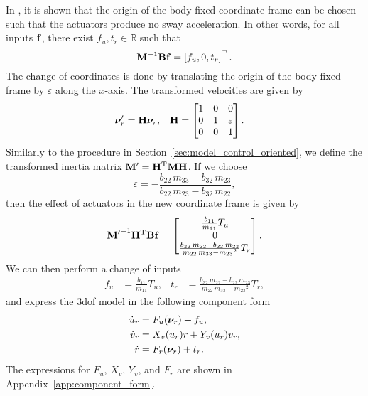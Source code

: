 In \cite{fredriksen_global_2006}, it is shown that the origin of the body-fixed coordinate frame can be chosen such that the actuators produce no sway acceleration.
In other words, for all inputs $\mathbf{f}$, there exist $f_u, t_r \in \mathbb{R}$ such that
\begin{equation}
    \mathbf{M}^{-1}\mathbf{B}\mathbf{f} = \left[f_u, 0, t_r\right]^{\mathrm{T}}.
\end{equation}
The change of coordinates is done by translating the origin of the body-fixed frame by $\varepsilon$ along the $x$-axis.
The transformed velocities are given by
\begin{align}
    \bm{\nu}_r^{\prime} &= \mathbf{H}\bm{\nu}_r, &
    \mathbf{H} &= 
    \begin{bmatrix}
        1 & 0 & 0 \\ 0 & 1 & \varepsilon \\ 0 & 0 & 1
    \end{bmatrix}.
\end{align}
Similarly to the procedure in Section~\ref{sec:model_control_oriented}, we define the transformed inertia matrix $\mathbf{M}^{\prime} = \mathbf{H}^{\mathrm{T}}\mathbf{M}\mathbf{H}$.
If we choose
\begin{equation}
    \varepsilon = -\frac{b_{22}\,m_{33}-b_{32}\,m_{23}}{b_{22}\,m_{23}-b_{32}\,m_{22}},
\end{equation}
then the effect of actuators in the new coordinate frame is given by
\begin{equation}
    {\mathbf{M}^{\prime}}^{-1}\mathbf{H}^{\mathrm{T}}\mathbf{B}\mathbf{f}
    =
    \begin{bmatrix} \frac{b_{11}}{m_{11}} T_{u} \\ 0 \\ \frac{b_{32}\,m_{22}-b_{22}\,m_{23}}{m_{22}\,m_{33}-{m_{23}}^2} T_{r} \end{bmatrix}.
\end{equation}
We can then perform a change of inputs
\begin{align}
    f_u &= \frac{b_{11}}{m_{11}} T_{u}, &
    t_r &= \frac{b_{32}\,m_{22}-b_{22}\,m_{23}}{m_{22}\,m_{33}-{m_{23}}^2} T_{r},
\end{align}
and express the 3\gls{dof} model in the following component form
\begin{subequations}
    \begin{align}
        \dot{u}_r &= F_u(\bm{\nu}_r) + f_u, \\
        \dot{v}_r &= X_v(u_r)r + Y_v(u_r)v_r, \\
        \dot{r} &= F_r(\bm{\nu}_r) + t_r.
    \end{align}
    \label{eq:background_component_form_3DOF}
\end{subequations}
The expressions for $F_u$, $X_v$, $Y_v$, and $F_r$ are shown in Appendix~\ref{app:component_form}.

